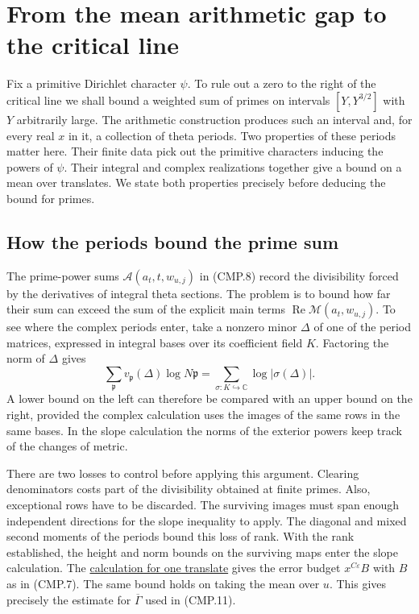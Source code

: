 \section{From the mean arithmetic gap to the critical line}
\label{sec:conditional-main-v42}

Fix a primitive Dirichlet character $\psi$. To rule out a zero to the
right of the critical line we shall bound a weighted sum of primes on
intervals $[Y,Y^{3/2}]$ with $Y$ arbitrarily large. The arithmetic
construction produces such an interval and, for every real $x$ in it,
a collection of theta periods. Two properties of these periods matter
here. Their finite data pick out the primitive characters inducing the
powers of $\psi$. Their integral and complex realizations together give
a bound on a mean over translates. We state both properties precisely
before deducing the bound for primes.


\subsection{How the periods bound the prime sum}

The prime-power sums $\mathcal A(a_t,t,w_{u,j})$ in (CMP.8) record the
divisibility forced by the derivatives of integral theta sections.
The problem is to bound how far their sum can exceed the sum of the
explicit main terms $\operatorname{Re}\mathcal M(a_t,w_{u,j})$. To see
where the complex periods enter, take a nonzero minor $\Delta$ of one
of the period matrices, expressed in integral bases over its coefficient
field $K$. Factoring the norm of $\Delta$ gives
\[
 \sum_{\mathfrak p} v_{\mathfrak p}(\Delta)\log N\mathfrak p
   =\sum_{\sigma:K\hookrightarrow\mathbb C}\log|\sigma(\Delta)|.
\]
A lower bound on the left can therefore be compared with an upper bound
on the right, provided the complex calculation uses the images of the
same rows in the same bases. In the slope calculation the norms of the
exterior powers keep track of the changes of metric.

There are two losses to control before applying this argument. Clearing
denominators costs part of the divisibility obtained at finite primes.
Also, exceptional rows have to be discarded. The surviving images must
span enough independent directions for the slope inequality to apply.
The diagonal and mixed second moments of the periods bound this loss of
rank. With the rank established, the height and norm bounds on the
surviving maps enter the slope calculation. The
\hyperref[sec:tied-window-completion]{calculation for one translate}
gives the error budget $x^{C\varepsilon}B$ with $B$ as in (CMP.7).
The same bound holds on taking the mean over $u$. This gives precisely
the estimate for $\overline\Gamma$ used in (CMP.11).

